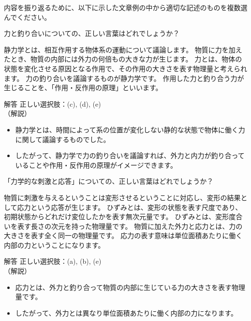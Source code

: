 \documentclass[uplatex,dvipdfmx,a4paper,11pt]{jsarticle}
\begin{document}
内容を振り返るために、以下に示した文章例の中から適切な記述のものを複数選んでください。
	\begin{qlist}
		\qitem 力と釣り合いについての、正しい言葉はどれでしょうか？
		\begin{qlist2}
			\qitem 静力学とは、相互作用する物体系の運動について議論します。
			\qitem 物質に力を加えたとき、物質の内部には外力の何倍もの大きな力が生じます。
			\qitem 力とは、物体の状態を変化させる原因となる作用で、その作用の大きさを表す物理量と考えられます。
			\qitem 力の釣り合いを議論するものが静力学です。
			\qitem 作用した力と釣り合う力が生じることを、「作用・反作用の原理」といいます。
		\end{qlist2}
    \vspace{3mm}
    \begin{itembox}[l]{解答}
        正しい選択肢：(c), (d), (e)\\
        （解説）
		\begin{itemize}
			\item 静力学とは、時間によって系の位置が変化しない静的な状態で物体に働く力に関して議論するものでした。
			\item したがって、静力学で力の釣り合いを議論すれば、外力と内力が釣り合っていることや作用・反作用の原理がイメージできます。
		\end{itemize}
    \end{itembox}
	\qitem 「力学的な刺激と応答」についての、正しい言葉はどれでしょうか？
		\begin{qlist2}
			\qitem 物質に刺激を与えるということは変形させるということに対応し、変形の結果として応力という応答が生じます。
			\qitem ひずみとは、変形の状態を表す尺度であり、初期状態からどれだけ変位したかを表す無次元量です。
			\qitem ひずみとは、変形度合いを表す長さの次元を持った物理量です。
			\qitem 物質に加えた外力と応力とは、力の大きさを表す全く同一の物理量です。
			\qitem 応力の表す意味は単位面積あたりに働く内部の力ということになります。
		\end{qlist2}
    \vspace{3mm}
    \begin{itembox}[l]{解答}
        正しい選択肢：(a), (b), (e)\\
        （解説）
		\begin{itemize}
			\item 応力とは、外力と釣り合って物質の内部に生じている力の大きさを表す物理量です。
			\item したがって、外力とは異なり単位面積あたりに働く内部の力になります。
		\end{itemize}

\end{itembox}
\end{qlist}
\end{document}
